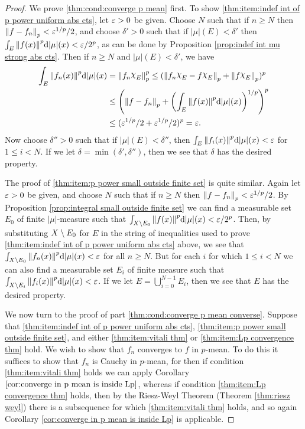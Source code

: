 \begin{proof}
We prove \ref{thm:cond:converge p mean} first. To show \ref{thm:item:indef int of p power uniform abs cts}, let $\varepsilon>0$ be given. Choose $N$ such that if $n\geq N$ then $\norm{f-f_n}_p<\varepsilon^{1/p}/2$, and choose $\delta'>0$ such that if $|\mu|(E)<\delta'$ then $\int_E\norm{f(x)}^p\dd|\mu|(x)<\varepsilon/2^p$, as can be done by Proposition \ref{prop:indef int mu strong abs cts}. Then if $n\geq N$ and $|\mu|(E)<\delta'$, we have 
\begin{align*}
\int_E\norm{f_n(x)}^p\dd|\mu|(x)&=\norm{f_n\idf{E}}_p^p\leq(\norm{f_n\idf{E}-f\idf{E}}_p+\norm{f\idf{E}}_p)^p\\
&\leq\br{\norm{f-f_n}_p+\br{\int_E\norm{f(x)}^p\dd|\mu|(x)}^{1/p}}^p\\
&\leq(\ep^{1/p}/2+\ep^{1/p}/2)^p=\ep.
\end{align*}
Now choose $\delta''>0$ such that if $|\mu|(E)<\delta''$, then $\int_E\norm{f_i(x)}^p\dd|\mu|(x)<\varepsilon$ for $1\leq i<N$. If we let $\delta=\min(\delta',\delta'')$, then we see that $\delta$ has the desired property.

The proof of \ref{thm:item:p power small outside finite set} is quite similar. Again let $\varepsilon>0$ be given, and choose $N$ such that if $n \geq N$ then $\norm{f-f_n}_p<\varepsilon^{1/p}/2$. By Proposition \ref{prop:integral small outside finite set} we can find a measurable set $E_0$ of finite $|\mu|$-measure such that $\int_{X\setminus E_0}\norm{f(x)}^p\dd|\mu|(x)<\varepsilon/2^p$. Then, by substituting $X\setminus E_0$ for $E$ in the string of inequalities used to prove \ref{thm:item:indef int of p power uniform abs cts} above, we see that $\int_{X\setminus E_0}\norm{f_n(x)}^p\dd|\mu|(x)<\varepsilon$ for all $n\geq N$. But for each $i$ for which $1\leq i<N$ we can also find a measurable set $E_i$ of finite measure such that $\int_{X\setminus E_i}\norm{f_i(x)}^p\dd|\mu|(x)<\varepsilon$. If we let $E=\bigcup_{i=0}^{N-1}E_i$, then we see that $E$ has the desired property.

We now turn to the proof of part \ref{thm:cond:converge p mean converse}. Suppose that \ref{thm:item:indef int of p power uniform abs cts}, \ref{thm:item:p power small outside finite set}, and either \ref{thm:item:vitali thm} or \ref{thm:item:Lp convergence thm} hold. We wish to show that $f_n$ converges to $f$ in $p$-mean. To do this it suffices to show that $f_n$ is Cauchy in $p$-mean, for then if condition \ref{thm:item:vitali thm} holds we can apply Corollary $\ref{cor:converge in p mean is inside Lp}$, whereas if condition \ref{thm:item:Lp convergence thm} holds, then by the Riesz-Weyl Theorem (Theorem \ref{thm:riesz weyl}) there is a subsequence for which \ref{thm:item:vitali thm} holds, and so again Corollary \ref{cor:converge in p mean is inside Lp} is applicable.


\end{proof}
